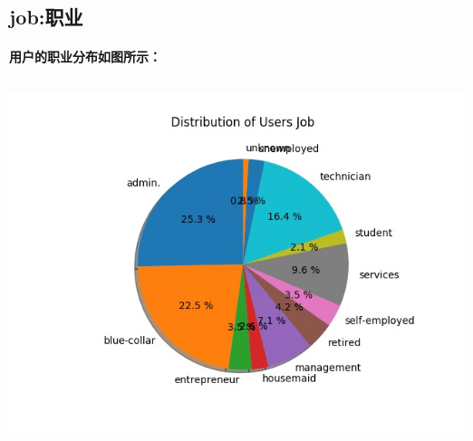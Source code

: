 \documentclass{ctexart}
\begin{document}
        \subsection{job:职业}
        \paragraph{
            用户的职业分布如图所示：
        }
        \begin{center}
            \includegraphics[height = 10.5cm]{job.jpg}
        \end{center}
\end{document}
